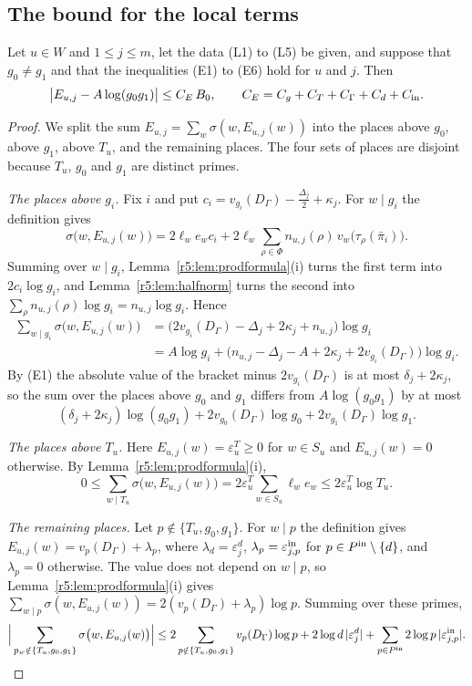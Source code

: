 \subsection{The bound for the local terms}\label{r5:sec:EAbound}

\begin{theorem}\label{r5:thm:Ebound}
Let $u\in W$ and $1\le j\le m$, let the data (L1) to (L5) be given, and suppose that $g_0\ne g_1$ and that the inequalities (E1) to (E6) hold for $u$ and $j$. Then
\[
\big\lvert E_{u,j}-A\log(g_0g_1)\big\rvert\le C_E\,B_0,\qquad C_E=C_g+C_T+C_\Gamma+C_d+C_{\rm in}.
\]
\end{theorem}

\begin{proof}
We split the sum $E_{u,j}=\sum_w\sigma(w,E_{u,j}(w))$ into the places above $g_0$, above $g_1$, above $T_u$, and the remaining places. The four sets of places are disjoint because $T_u$, $g_0$ and $g_1$ are distinct primes.

\emph{The places above $g_i$.} Fix $i$ and put $c_i=v_{g_i}(D_\Gamma)-\frac{\Delta_j}2+\kappa_j$. For $w\mid g_i$ the definition gives
\[
\sigma\big(w,E_{u,j}(w)\big)=2\ell_we_wc_i+2\ell_w\sum_{\rho\in\Phi}n_{u,j}(\rho)\,v_w\big(\tau_\rho(\bar\pi_i)\big).
\]
Summing over $w\mid g_i$, Lemma~\ref{r5:lem:prodformula}(i) turns the first term into $2c_i\log g_i$, and Lemma~\ref{r5:lem:halfnorm} turns the second into $\sum_\rho n_{u,j}(\rho)\log g_i=n_{u,j}\log g_i$. Hence
\begin{align*}
\sum_{w\mid g_i}\sigma\big(w,E_{u,j}(w)\big)&=\big(2v_{g_i}(D_\Gamma)-\Delta_j+2\kappa_j+n_{u,j}\big)\log g_i\\
&=A\log g_i+\big(n_{u,j}-\Delta_j-A+2\kappa_j+2v_{g_i}(D_\Gamma)\big)\log g_i .
\end{align*}
By (E1) the absolute value of the bracket minus $2v_{g_i}(D_\Gamma)$ is at most $\delta_j+2\kappa_j$, so the sum over the places above $g_0$ and $g_1$ differs from $A\log(g_0g_1)$ by at most
\[
(\delta_j+2\kappa_j)\log(g_0g_1)+2v_{g_0}(D_\Gamma)\log g_0+2v_{g_1}(D_\Gamma)\log g_1 .
\]

\emph{The places above $T_u$.} Here $E_{u,j}(w)=\varepsilon^T_u\ge0$ for $w\in S_u$ and $E_{u,j}(w)=0$ otherwise. By Lemma~\ref{r5:lem:prodformula}(i),
\[
0\le\sum_{w\mid T_u}\sigma\big(w,E_{u,j}(w)\big)=2\varepsilon^T_u\sum_{w\in S_u}\ell_we_w\le2\varepsilon^T_u\log T_u .
\]

\emph{The remaining places.} Let $p\notin\{T_u,g_0,g_1\}$. For $w\mid p$ the definition gives $E_{u,j}(w)=v_p(D_\Gamma)+\lambda_p$, where $\lambda_d=\varepsilon^d_j$, $\lambda_p=\varepsilon^{\rm in}_{j,p}$ for $p\in P^{\rm in}\setminus\{d\}$, and $\lambda_p=0$ otherwise. The value does not depend on $w\mid p$, so Lemma~\ref{r5:lem:prodformula}(i) gives $\sum_{w\mid p}\sigma(w,E_{u,j}(w))=2(v_p(D_\Gamma)+\lambda_p)\log p$. Summing over these primes,
\[
\Big\lvert\sum_{p_w\notin\{T_u,g_0,g_1\}}\sigma\big(w,E_{u,j}(w)\big)\Big\rvert\le2\sum_{p\notin\{T_u,g_0,g_1\}}v_p(D_\Gamma)\log p+2\log d\,\lvert\varepsilon^d_j\rvert+\sum_{p\in P^{\rm in}}2\log p\,\lvert\varepsilon^{\rm in}_{j,p}\rvert .
\]


\end{proof}

